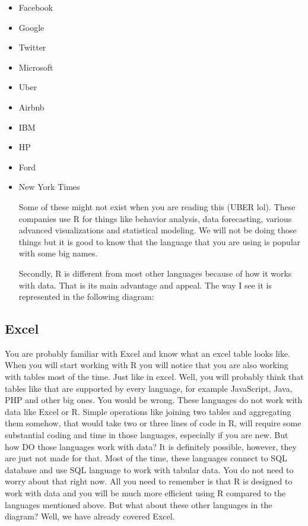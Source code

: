 \documentclass[]{book}
\begin{document}
\begin{itemize}
\item
  Facebook
\item
  Google
\item
  Twitter
\item
  Microsoft
\item
  Uber
\item
  Airbnb
\item
  IBM
\item
  HP
\item
  Ford
\item
  New York Times

  Some of these might not exist when you are reading this (UBER lol). These companies use R for things like behavior analysis, data forecasting, various advanced visualizations and statistical modeling. We will not be doing those things but it is good to know that the language that you are using is popular with some big names.

  Secondly, R is different from most other languages because of how it works with data. That is its main advantage and appeal. The way I see it is represented in the following diagram:
\end{itemize}

\hypertarget{excel}{%
\subsection{Excel}\label{excel}}

You are probably familiar with Excel and know what an excel table looks like. When you will start working with R you will notice that you are also working with tables most of the time. Just like in excel. Well, you will probably think that tables like that are supported by every language, for example JavaScript, Java, PHP and other big ones. You would be wrong. These languages do not work with data like Excel or R. Simple operations like joining two tables and aggregating them somehow, that would take two or three lines of code in R, will require some substantial coding and time in those languages, especially if you are new. But how DO those languages work with data? It is definitely possible, however, they are just not made for that. Most of the time, these languages connect to SQL database and use SQL language to work with tabular data. You do not need to worry about that right now. All you need to remember is that R is designed to work with data and you will be much more efficient using R compared to the languages mentioned above. But what about these other languages in the diagram? Well, we have already covered Excel.
\end{document}
